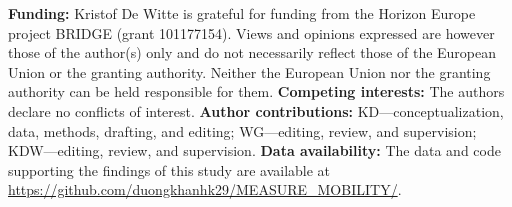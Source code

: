 \textbf{Funding:} Kristof De Witte is grateful for funding from the Horizon Europe project BRIDGE (grant 101177154). Views and opinions expressed are however those of the author(s) only and do not necessarily reflect those of the European Union or the granting authority. Neither the European Union nor the granting authority can be held responsible for them.
\textbf{Competing interests:} The authors declare no conflicts of interest.
\textbf{Author contributions:} KD---conceptualization, data, methods, drafting, and editing; WG---editing, review, and supervision; KDW---editing, review, and supervision.
\textbf{Data availability:} The data and code supporting the findings of this study are available at \url{https://github.com/duongkhanhk29/MEASURE_MOBILITY/}.
